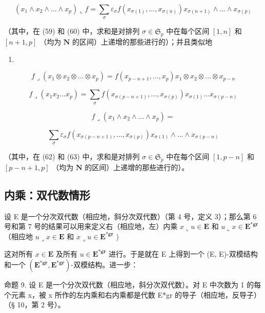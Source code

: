 \[
\left(x _ {1} \wedge x _ {2} \wedge \dots \wedge x _ {p}\right) \llcorner f = \sum_ {\sigma} \varepsilon_ {\sigma} f \left(x _ {\sigma (1)}, \dots , x _ {\sigma (n)}\right) x _ {\sigma (n + 1)} \wedge \dots \wedge x _ {\sigma (p)}
\]

（其中，在 (59) 和 (60) 中，求和是对排列 \(\sigma \in \mathfrak{S}_p\) 中在每个区间 \([1, n]\) 和 \([n + 1, p]\) （均为 \(\mathbf{N}\) 的区间）上递增的那些进行的）；并且类似地

\begin{enumerate}
\def\labelenumi{(\arabic{enumi})}
\setcounter{enumi}{60}
\tightlist
\item
\end{enumerate}

\[
f \lrcorner (x _ {1} \otimes x _ {2} \otimes \dots \otimes x _ {p}) = f (x _ {p - n + 1}, \dots , x _ {p}) x _ {1} \otimes x _ {2} \otimes \dots \otimes x _ {p - n}\tag{62}
\]

\[
f \lrcorner (x _ {1} x _ {2} \dots x _ {p}) = \sum_ {\sigma} f (x _ {\sigma (p - n + 1)}, \dots , x _ {\sigma (p)}) x _ {\sigma (1)} \dots x _ {\sigma (p - n)}\tag{63}
\]

\[
f \lrcorner (x _ {1} \wedge x _ {2} \wedge \dots \wedge x _ {p}) =
\]

\[
\sum_ {\sigma} \varepsilon_ {\sigma} f (x _ {\sigma (p - n + 1)}, \dots , x _ {\sigma (p)}) x _ {\sigma (1)} \wedge \dots \wedge x _ {\sigma (p - n)}
\]

（其中，在 (62) 和 (63) 中，求和是对排列 \(\sigma \in \mathfrak{S}_p\) 中在每个区间 \([1, p - n]\) 和 \([p - n + 1, p]\) （均为 \(\mathbf{N}\) 的区间）上递增的那些进行的）。

\subsection{内乘：双代数情形}

设 E 是一个分次双代数（相应地，斜分次双代数）（第 4 号，定义 3）；那么第 6 号和第 7 号的结果可以用来定义右（相应地，左）内乘 \(x \llcorner u \in \mathbf{E}\) 和 \(u \llcorner x \in \mathbf{E}^{*\mathbf{gr}}\) （相应地 \(u \lrcorner x \in \mathbf{E}\) 和 \(x \lrcorner u \in \mathbf{E}^{*\mathbf{gr}}\) )

这对所有 \(x \in \mathbf{E}\) 及所有 \(u \in \mathbf{E}^{*\mathbf{gr}}\) 进行。于是就在 E 上得到一个 (E, E)-双模结构和一个 \((\mathbf{E}^{*\mathbf{gr}}, \mathbf{E}^{*\mathbf{gr}})\)-双模结构。进一步：

命题 9. 设 E 是一个分次双代数（相应地，斜分次双代数）。对 E 中次数为 1 的每个元素 x，被 x 所作的左内乘和右内乘都是代数 E*gr 的导子（相应地，反导子）（§ 10，第 2 号）。

